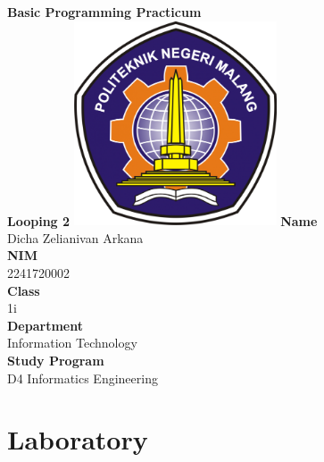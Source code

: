 \documentclass[12pt,titlepage]{article}
\newcommand{\vSubject}{Basic Programming Practicum}
\newcommand{\vSubtitle}{Looping 2}
\newcommand{\vName}{Dicha Zelianivan Arkana}
\newcommand{\vNIM}{2241720002}
\newcommand{\vClass}{1i}
\newcommand{\vDepartment}{Information Technology}
\newcommand{\vStudyProgram}{D4 Informatics Engineering}
\begin{document}
\begin{titlepage}
    \centering
    \vfill
    {\bfseries\LARGE
        \vSubject\\
        \vskip0.25cm
        \vSubtitle
    }
    \vfill
    \includegraphics[width=6cm]{images/polinema-logo.png}
    \vfill
    {
        \textbf{Name}\\
        \vName\\
        \vskip0.5cm
        \textbf{NIM}\\
        \vNIM\\
        \vskip0.5cm
        \textbf{Class}\\
        \vClass\\
        \vskip0.5cm
        \textbf{Department}\\
        \vDepartment\\
        \vskip0.5cm
        \textbf{Study Program}\\
        \vStudyProgram
    }
\end{titlepage}

\section{Laboratory}
\end{document}
